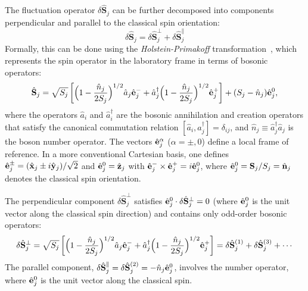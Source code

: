\documentclass[aps, prx, nofootinbib, superscriptaddress]{revtex4-2}
\begin{document}
The fluctuation operator $\delta \hat{\mathbf{S}}_{j}$ can be further decomposed into components perpendicular and parallel to the classical spin orientation:
\begin{equation}
    \delta \hat{\mathbf{S}}_{j} = \delta \hat{\mathbf{S}}_{j}^{\perp} + \delta \hat{\mathbf{S}}_{j}^{\parallel} 
\end{equation}
Formally, this can be done using the \emph{Holstein-Primakoff} transformation~\cite{PhysRev.58.1098}, which represents the spin operator in the laboratory frame in terms of bosonic operators:
\begin{equation}
    \hat{\bf S}_{j} 
    = \sqrt{S_{j}} 
    \left[ 
    \Big( 1 - \frac{\hat{n}_{j}}{2S_{j}} \Big)^{1/2} \hat{a}_{j} \hat{\bf e}_{j}^{-} + 
    \hat{a}_{j}^{\dagger} \Big( 1 - \frac{\hat{n}_{j}}{2S_{j}} \Big)^{1/2} \hat{\bf e}_{j}^{+}
    \right]
    + (S_{j} - \hat{n}_{j}) \hat{\bf e}_{j}^{0},
\end{equation}
where the operators $\hat{a}_{i}$ and $\hat{a}_{i}^{\dagger}$ are the bosonic annihilation and creation operators that satisfy the canonical commutation relation $[\hat{a}_{i}, \hat{a}_{j}^{\dagger}] = \delta_{ij}$, and $\hat{n}_{j} \equiv \hat{a}^{\dagger}_{j} \hat{a}_{j}$ is the boson number operator. 
The vectors $\hat{\bf e}_{j}^{\alpha}$ ($\alpha = \pm, 0$) define a local frame of reference. In a more conventional Cartesian basis, one defines $\hat{\bf e}_{j}^{\pm} = (\hat{\bf x}_{j} \pm i \hat{\bf y}_{j})/\sqrt{2}$ and $\hat{\bf e}_{j}^{0} = \hat{\bf z}_{j}$ with $\hat{\bf e}_{j}^{-} \times \hat{\bf e}_{j}^{+} = i \hat{\bf e}_{j}^{0}$, where $\hat{\bf e}^{0}_{j} = {\bf S}_{j} / {S_{j}} = \hat{\bf n}_{j}$ denotes the classical spin orientation.

The perpendicular component $ \delta \hat{\mathbf{S}}_{j}^{\perp}$ satisfies $ \hat{\bf e}_{j}^{0} \cdot \delta \hat{\mathbf{S}}_{j}^{\perp} = 0 $ (where $\hat{\bf e}_{j}^{0}$ is the unit vector along the classical spin direction) and contains only odd-order bosonic operators: 
\begin{equation}
    \delta \hat{\mathbf{S}}_{j}^{\perp} = \sqrt{S_{j}}\left[ 
    \Big( 1 - \frac{\hat{n}_{j}}{2S_{j}} \Big)^{1/2} \hat{a}_{j} \hat{\bf e}_{j}^{-} + 
    \hat{a}_{j}^{\dagger} \Big( 1 - \frac{\hat{n}_{j}}{2S_{j}} \Big)^{1/2} \hat{\bf e}_{j}^{+}
    \right] 
    = \delta \hat{\mathbf{S}}_{j}^{(1)} + \delta \hat{\mathbf{S}}_{j}^{(3)} + \cdots 
\end{equation}
The parallel component, $\delta \hat{\mathbf{S}}_{j}^{\parallel} = \delta \hat{\mathbf{S}}_{j}^{(2)} = -\hat{n}_{j} \hat{\bf e}_{j}^{0}$, involves the number operator, where $\hat{\bf e}_{j}^{0}$ is the unit vector along the classical spin.
\end{document}

